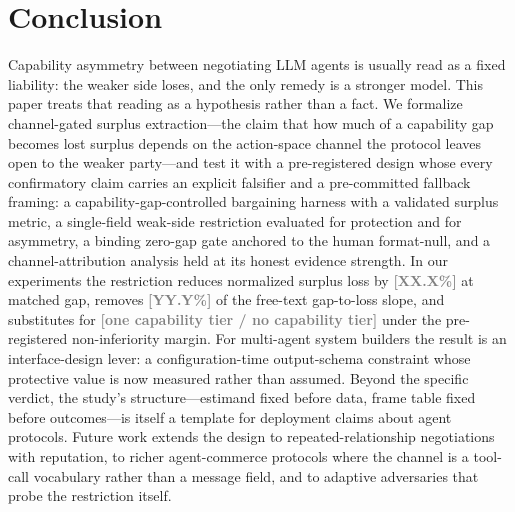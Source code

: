 \documentclass[conference]{IEEEtran}
\newcommand{\ph}[1]{\textcolor{Gray}{\textbf{[#1]}}}
\begin{document}
\section{Conclusion}
\label{sec:conclusion}

Capability asymmetry between negotiating LLM agents is usually read as a fixed liability: the weaker side loses, and the only remedy is a stronger model. This paper treats that reading as a hypothesis rather than a fact. We formalize channel-gated surplus extraction---the claim that how much of a capability gap becomes lost surplus depends on the action-space channel the protocol leaves open to the weaker party---and test it with a pre-registered design whose every confirmatory claim carries an explicit falsifier and a pre-committed fallback framing: a capability-gap-controlled bargaining harness with a validated surplus metric, a single-field weak-side restriction evaluated for protection and for asymmetry, a binding zero-gap gate anchored to the human format-null, and a channel-attribution analysis held at its honest evidence strength. In our experiments the restriction reduces normalized surplus loss by \ph{XX.X\%} at matched gap, removes \ph{YY.Y\%} of the free-text gap-to-loss slope, and substitutes for \ph{one capability tier / no capability tier} under the pre-registered non-inferiority margin. For multi-agent system builders the result is an interface-design lever: a configuration-time output-schema constraint whose protective value is now measured rather than assumed. Beyond the specific verdict, the study's structure---estimand fixed before data, frame table fixed before outcomes---is itself a template for deployment claims about agent protocols. Future work extends the design to repeated-relationship negotiations with reputation, to richer agent-commerce protocols where the channel is a tool-call vocabulary rather than a message field, and to adaptive adversaries that probe the restriction itself.

\balance


\end{document}
